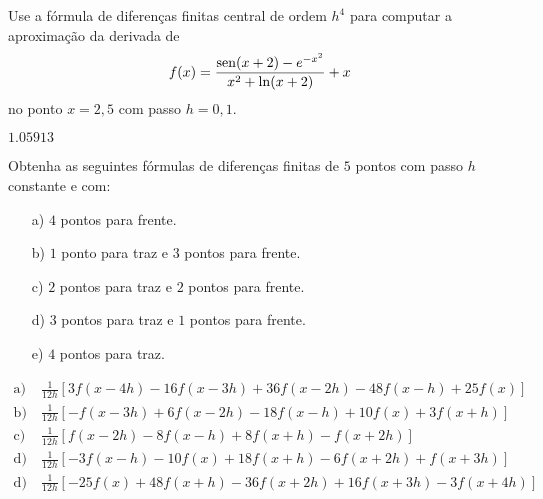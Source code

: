 \begin{exer}\label{exer:dfch4_fun}
  Use a fórmula de diferenças finitas central de ordem $h^4$ para computar a aproximação da derivada de
  \begin{equation}
    f(x) = \frac{\operatorname{sen}(x+2) - e^{-x^2}}{x^2 + \ln(x+2)}+x
  \end{equation}
no ponto $x=2,5$ com passo $h=0,1$.
\end{exer}
\begin{resp}
  $1.05913$
\end{resp}

\begin{exer}\label{exer:df_5pts_pi}
  Obtenha as seguintes fórmulas de diferenças finitas de $5$ pontos com passo $h$ constante e com:
  \begin{enumerate}
  \item[a)] $4$ pontos para frente.
  \item[b)] $1$ ponto para traz e $3$ pontos para frente.
  \item[c)] $2$ pontos para traz e $2$ pontos para frente.
  \item[d)] $3$ pontos para traz e $1$ pontos para frente.
  \item[e)] $4$ pontos para traz.
  \end{enumerate}
\end{exer}
\begin{resp}
  \begin{tiny}
    \begin{align*}
      \text{a)}&~\frac{1}{12 h} \left[3 f{\left (x- 4h \right )} - 16 f{\left (x- 3 h \right )} + 36 f{\left (x- 2 h \right )} - 48 f{\left (x- h \right ) + 25 f{\left (x \right )}}\right]\\
      \text{b)}&~\frac{1}{12 h} \left[- f{\left (x- 3 h \right )} + 6 f{\left ( x- 2 h \right )} - 18 f{\left (x- h \right )} + 10 f{\left (x \right )} + 3 f{\left (x+h \right )}\right]\\
      \text{c)}&~\frac{1}{12h} \left[f{\left (x - 2 h\right )} - 8 f{\left(x - h \right )} + 8 f{\left (x + h \right )} - f{\left (x + 2 h \right )}\right]\\
      \text{d)}&~\frac{1}{12 h} \left[- 3 f{\left ( x-h \right )} - 10 f{\left (x \right )} + 18 f{\left (x+h \right )} - 6 f{\left (x+2 h \right )} + f{\left ( x+3 h \right )}\right]\\
      \text{d)}&~\frac{1}{12 h} \left[- 25 f{\left (x \right )} + 48 f{\left ( x+h \right )} - 36 f{\left ( x+2 h \right )} + 16 f{\left ( x+3 h \right )} - 3 f{\left ( x+4 h \right )}\right]
    \end{align*}
  \end{tiny}
\end{resp}


